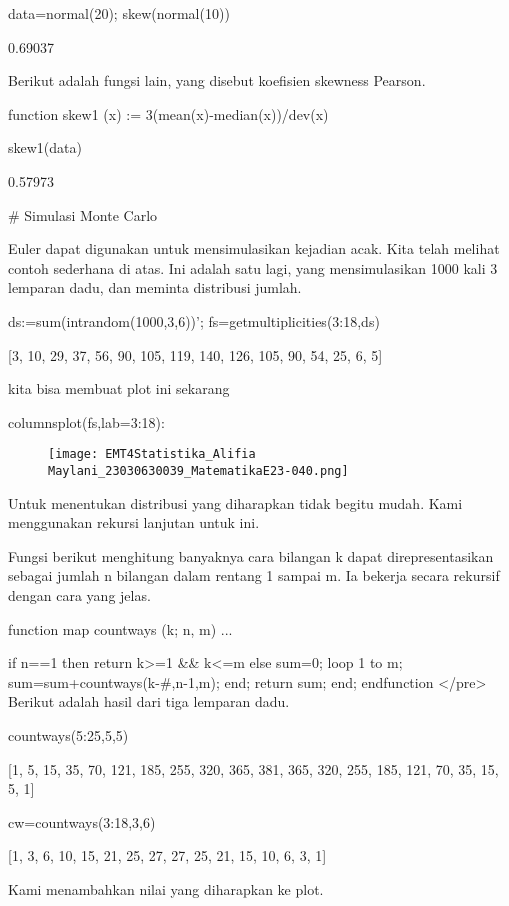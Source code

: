 \documentclass{article}
\begin{document}
\>data=normal(20); skew(normal(10))


    0.69037

Berikut adalah fungsi lain, yang disebut koefisien skewness Pearson.


\>function skew1 (x) := 3\*(mean(x)-median(x))/dev(x)

\>skew1(data)


    0.57973

# Simulasi Monte Carlo

Euler dapat digunakan untuk mensimulasikan kejadian acak. Kita telah
melihat contoh sederhana di atas. Ini adalah satu lagi, yang
mensimulasikan 1000 kali 3 lemparan dadu, dan meminta distribusi
jumlah.


\>ds:=sum(intrandom(1000,3,6))';  fs=getmultiplicities(3:18,ds)


    [3,  10,  29,  37,  56,  90,  105,  119,  140,  126,  105,  90,  54,
    25,  6,  5]

kita bisa membuat plot ini sekarang


\>columnsplot(fs,lab=3:18):


\begin{figure}
    \centering
    \texttt{[image: EMT4Statistika\_Alifia Maylani\_23030630039\_MatematikaE23-040.png]}
    \caption{}
    \label{fig:enter-label}
\end{figure}

Untuk menentukan distribusi yang diharapkan tidak begitu mudah. Kami
menggunakan rekursi lanjutan untuk ini.


Fungsi berikut menghitung banyaknya cara bilangan k dapat
direpresentasikan sebagai jumlah n bilangan dalam rentang 1 sampai m.
Ia bekerja secara rekursif dengan cara yang jelas.


\>function map countways (k; n, m) ...


      if n==1 then return k>=1 && k<=m
      else
        sum=0; 
        loop 1 to m; sum=sum+countways(k-#,n-1,m); end;
        return sum;
      end;
    endfunction
</pre>
Berikut adalah hasil dari tiga lemparan dadu.


\>countways(5:25,5,5)


    [1,  5,  15,  35,  70,  121,  185,  255,  320,  365,  381,  365,  320,
    255,  185,  121,  70,  35,  15,  5,  1]

\>cw=countways(3:18,3,6)


    [1,  3,  6,  10,  15,  21,  25,  27,  27,  25,  21,  15,  10,  6,  3,
    1]

Kami menambahkan nilai yang diharapkan ke plot.
\end{document}
